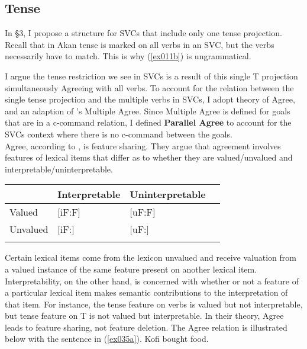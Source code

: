 \documentclass[output=paper,colorlinks,citecolor=brown]{langscibook}
\begin{document}
\subsection{Tense}
In \S3, I propose a structure for SVCs that include only one tense projection.  Recall that in Akan tense is marked on all verbs in an SVC, but the verbs necessarily have to match. This is why (\ref{ex011b}) is ungrammatical. 

\ea \label{ex011}
    
 \z \z 
 I argue the tense restriction we see in SVCs is a result of this single T projection simultaneously Agreeing with all verbs. To account for the relation between the single tense projection and the multiple verbs in SVCs, I adopt  theory of Agree, and an adaption of \citeauthor{Hiraiwa2001}'s \citeyearpar{Hiraiwa2001} Multiple Agree. Since Multiple Agree is defined for goals that are in a c-command relation, I defined  \textbf{Parallel Agree} to account for the SVCs context where there is no c-command between the goals.\\ Agree, according to \citet{PesetskyTorrego2007},  is feature sharing. They argue that agreement involves features of lexical items that differ as to whether they are valued/unvalued and interpretable/uninterpretable.  
  
  \ea\label{ex23}
   \begin{tabular}[t]{l  l  l  l }
   	\lsptoprule
  	& Interpretable & Uninterpretable\\
  	\midrule
  	Valued & [iF:F] & [uF:F]\\
  	Unvalued & [iF:] & [uF:]\\
  	\lspbottomrule
  \end{tabular}
  \z Certain lexical items come from the lexicon unvalued and receive valuation from a valued instance of the same feature present on another lexical item. Interpretability, on the other hand, is concerned with whether or not a feature of a particular lexical item makes semantic contributions to the interpretation of that item. For instance, the tense feature on verbs is valued but not interpretable, but tense feature on T is not valued but interpretable. In their theory, Agree leads to feature sharing, not feature deletion. The Agree relation is illustrated below with the sentence in (\ref{ex035a}).
  \ea \label{ex035a}
Kofi bought food. 
\z
\end{document}

